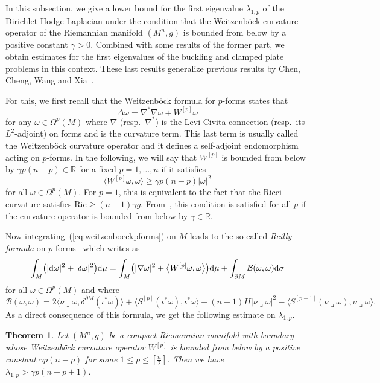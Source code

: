 \documentclass[pdftex]{sigma}
\numberwithin{equation}{section}
\newtheorem{Theorem}{Theorem}[section]
\theoremstyle{definition}
\begin{document}
In this subsection, we give a lower bound for the first eigenvalue $\lambda_{1,p}$ of the Dirichlet Hodge Laplacian under the condition that the Weitzenb\"ock curvature operator of the Riemannian manifold $(M^n,g)$ is bounded from below by a positive constant $\gamma>0$. Combined with some results of the former part, we obtain estimates for the first eigenvalues of the buckling and clamped plate problems in this context. These last results generalize previous results by Chen, Cheng, Wang and Xia~\cite{ChenChengWangXia2012}.

For this, we first recall that the Weitzenb\"ock formula for $p$-forms states that
\begin{equation}\label{eq:weitzenboeckpforms}
\Delta\omega=\nabla^*\nabla\omega+W^{[p]}\omega
\end{equation}
for any $\omega\in\Omega^p(M)$ where $\nabla$ (resp.\ $\nabla^*$) is the Levi-Civita connection \big(resp.\ its $L^2$-adjoint\big) on forms and  is the curvature term. This last term is usually called the Weitzenb\"ock curvature operator and it defines a self-adjoint endomorphism acting on $p$-forms.
In the following, we will say that $W^{[p]}$ is bounded from below by $\gamma p(n-p)\in\mathbb{R}$ for a fixed $p=1,\dots,n$ if it satisfies
\begin{equation}\label{BCOperator}
\bigl\langle W^{[p]}\omega,\omega\bigr\rangle\geq \gamma p(n-p)|\omega|^2
\end{equation}
for all $\omega\in\Omega^p(M)$.
For $p=1$, this is equivalent to the fact that the Ricci curvature satisfies $\mathrm{Ric}\geq (n-1)\gamma g$.
From~\cite{GM}, this condition is satisfied for all $p$ if the curvature operator is bounded from below by $\gamma\in\mathbb{R}$.

Now integrating~(\ref{eq:weitzenboeckpforms}) on $M$ leads to the so-called {\it Reilly formula} on $p$-forms~\cite[Theorem~3]{RaulotSavo2011} which writes as
\begin{equation}\label{eq:Reillyformula}
\int_M\bigl(|{\rm d}\omega|^2+|\delta\omega|^2\bigr){\rm d}\mu=\int_M\bigl(|\nabla\omega|^2+\bigl\langle W^{[p]}\omega,\omega\bigr\rangle\bigr){\rm d}\mu+\int_{\partial M}\mathcal{B}(\omega,\omega){\rm d}\sigma
\end{equation}
for all $\omega\in\Omega^p(M)$ and where
\[
\mathcal{B}(\omega,\omega)=2\bigl\langle\nu\lrcorner\omega,\delta^{\partial M}(\iota^*\omega)\bigr\rangle+\bigl\langle S^{[p]}(\iota^*\omega),\iota^*\omega\bigr\rangle+(n-1)H|\nu\lrcorner\omega|^2-\bigl\langle S^{[p-1]}(\nu\lrcorner\omega),\nu\lrcorner\omega\bigr\rangle.
\]
As a direct consequence of this formula, we get the following estimate on $\lambda_{1,p}$.
\begin{Theorem}\label{GM_Dirichlet}
Let $(M^n,g)$ be a compact Riemannian manifold with boundary whose Weitzen\-b\"ock curvature operator $W^{[p]}$ is bounded from below by a positive constant $\gamma p(n-p)$ for some $1\leq p\leq [\frac{n}{2}]$.
Then we have $\lambda_{1,p}>\gamma p(n-p+1)$.
\end{Theorem}
\end{document}
